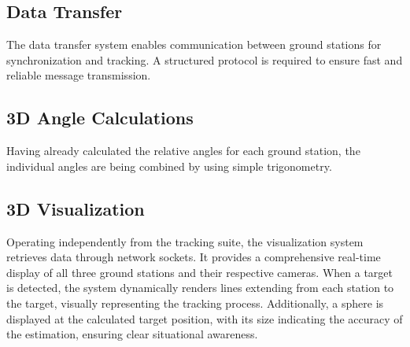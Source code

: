
\subsection{Data Transfer}

The data transfer system enables communication between ground stations for synchronization and tracking. A structured protocol is required to ensure fast and reliable message transmission.

\subsection{3D Angle Calculations}
Having already calculated the relative angles for each ground station, the individual angles are being combined by using simple trigonometry. 



\subsection{3D Visualization}
Operating independently from the tracking suite, the visualization system retrieves data through network sockets. It provides a comprehensive real-time display of all three ground stations and their respective cameras. When a target is detected, the system dynamically renders lines extending from each station to the target, visually representing the tracking process. Additionally, a sphere is displayed at the calculated target position, with its size indicating the accuracy of the estimation, ensuring clear situational awareness.
